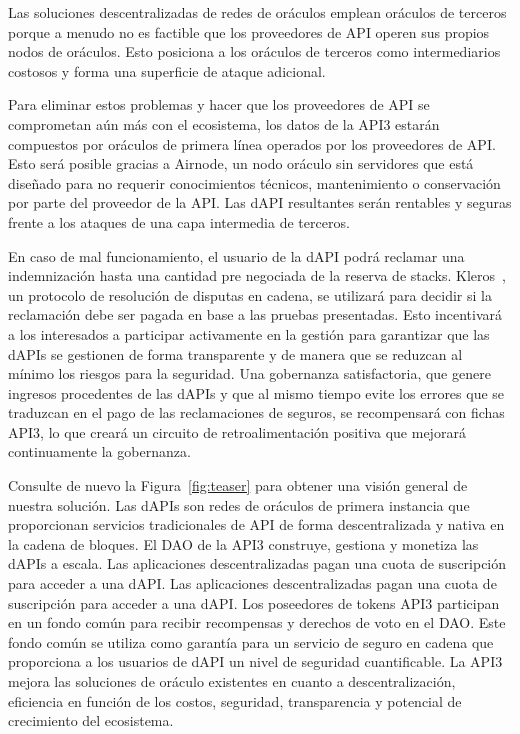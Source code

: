\documentclass[11pt]{article}
\begin{document}
Las soluciones descentralizadas de redes de oráculos emplean oráculos de terceros porque a menudo no es factible que los proveedores de API operen sus propios nodos de oráculos. Esto posiciona a los oráculos de terceros como intermediarios costosos y forma una superficie de ataque adicional.
 
Para eliminar estos problemas y hacer que los proveedores de API se comprometan aún más con el ecosistema, los datos de la API3 estarán compuestos por oráculos de primera línea operados por los proveedores de API. Esto será posible gracias a Airnode, un nodo oráculo sin servidores que está diseñado para no requerir conocimientos técnicos, mantenimiento o conservación por parte del proveedor de la API. Las dAPI resultantes serán rentables y seguras frente a los ataques de una capa intermedia de terceros.

En caso de mal funcionamiento, el usuario de la dAPI podrá reclamar una indemnización hasta una cantidad pre negociada de la reserva de stacks. Kleros~\cite{kleros:2019}, un protocolo de resolución de disputas en cadena, se utilizará para decidir si la reclamación debe ser pagada en base a las pruebas presentadas. Esto incentivará a los interesados a participar activamente en la gestión para garantizar que las dAPIs se gestionen de forma transparente y de manera que se reduzcan al mínimo los riesgos para la seguridad. Una gobernanza satisfactoria, que genere ingresos procedentes de las dAPIs y que al mismo tiempo evite los errores que se traduzcan en el pago de las reclamaciones de seguros, se recompensará con fichas API3, lo que creará un circuito de retroalimentación positiva que mejorará continuamente la gobernanza.

Consulte de nuevo la Figura~\ref{fig:teaser} para obtener una visión general de nuestra solución. Las dAPIs son redes de oráculos de primera instancia que proporcionan servicios tradicionales de API de forma descentralizada y nativa en la cadena de bloques. El DAO de la API3 construye, gestiona y monetiza las dAPIs a escala. Las aplicaciones descentralizadas pagan una cuota de suscripción para acceder a una dAPI. Las aplicaciones descentralizadas pagan una cuota de suscripción para acceder a una dAPI. Los poseedores de tokens API3 participan en un fondo común para recibir recompensas y derechos de voto en el DAO. Este fondo común se utiliza como garantía para un servicio de seguro en cadena que proporciona a los usuarios de dAPI un nivel de seguridad cuantificable. La API3 mejora las soluciones de oráculo existentes en cuanto a descentralización, eficiencia en función de los costos, seguridad, transparencia y potencial de crecimiento del ecosistema.
\end{document}
